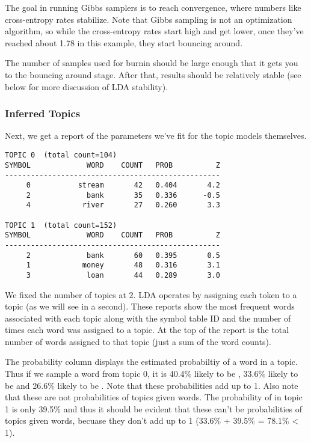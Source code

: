 The goal in running Gibbs samplers is to reach convergence, where
numbers like cross-entropy rates stabilize.  Note that Gibbs sampling
is not an optimization algorithm, so while the cross-entropy rates
start high and get lower, once they've reached about 1.78 in this
example, they start bouncing around.  

The number of samples used for burnin should be large enough that it
gets you to the bouncing around stage.  After that, results should be
relatively stable (see below for more discussion of LDA stability).

\subsubsection{Inferred Topics}

Next, we get a report of the parameters we've fit for the topic
models themselves.
%
\begin{verbatim}
TOPIC 0  (total count=104)
SYMBOL             WORD    COUNT   PROB          Z
--------------------------------------------------
     0           stream       42   0.404       4.2
     2             bank       35   0.336      -0.5
     4            river       27   0.260       3.3

TOPIC 1  (total count=152)
SYMBOL             WORD    COUNT   PROB          Z
--------------------------------------------------
     2             bank       60   0.395       0.5
     1            money       48   0.316       3.1
     3             loan       44   0.289       3.0
\end{verbatim}
%
We fixed the number of topics at 2.  LDA operates by assigning each
token to a topic (as we will see in a second).  These reports show the
most frequent words associated with each topic along with the symbol
table ID and the number of times each word was assigned to a topic.
At the top of the report is the total number of words assigned to that
topic (just a sum of the word counts).  

The probability column displays the estimated probabiltiy of a word in
a topic.  Thus if we sample a word from topic 0, it is 40.4\% likely
to be , 33.6\% likely to be 
and 26.6\% likely to be .  Note that these
probabilities add up to 1.  Also note that these are not probabilities
of topics given words.  The probability of  in
topic 1 is only 39.5\% and thus it should be evident that these can't
be probabilities of topics given words, becuase they don't add up to 1
(33.6\% + 39.5\% = 78.1\% < 1).

